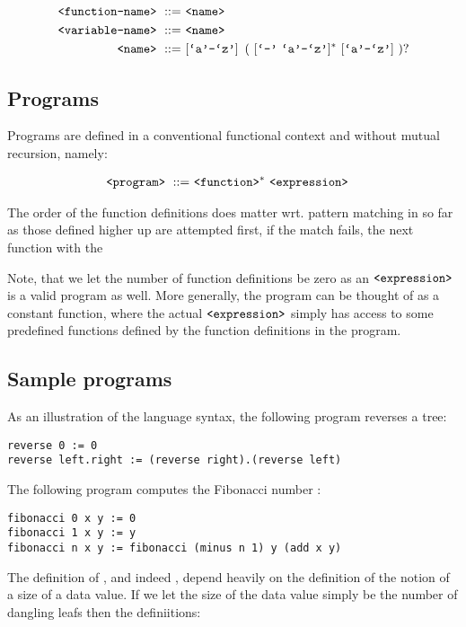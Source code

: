 \begin{align}
\text{{\ttfamily<function-name>}}\ ::=&\ \text{{\ttfamily<name>}}\\
\text{{\ttfamily<variable-name>}}\ ::=&\ \text{{\ttfamily<name>}}\\
\text{{\ttfamily<name>}}\ ::=&\ [\text{{\ttfamily`a'}}\text{{\ttfamily-}}\text{{\ttfamily`z'}}]
\ \left (\ [\text{{\ttfamily`-'}}\ \text{{\ttfamily`a'}}\text{{\ttfamily-}}\text{{\ttfamily`z'}}]^*
\ [\text{{\ttfamily`a'}}\text{{\ttfamily-}}\text{{\ttfamily`z'}}]\ \right )?
\end{align}

\subsection{Programs}

Programs are defined in a conventional functional context and without mutual
recursion, namely:

\begin{align}
\text{{\ttfamily<program>}}\ ::=&\ \text{{\ttfamily<function>}}^*\ \text{{\ttfamily<expression>}}
\end{align}

The order of the function definitions does matter wrt. pattern matching in so far as those defined higher up are attempted first, if the match fails, the next function with the

Note, that we let the number of function definitions be zero as an
$\text{{\ttfamily<expression>}}$ is a valid program as well. More generally, the program
can be thought of as a constant function, where the actual
$\text{{\ttfamily<expression>}}$ simply has access to some predefined functions defined
by the function definitions in the program.

\subsection{Sample programs}

As an illustration of the language syntax, the following program reverses a tree:

\begin{verbatim}
reverse 0 := 0
reverse left.right := (reverse right).(reverse left)
\end{verbatim}

The following program computes the Fibonacci number :

\begin{verbatim}
fibonacci 0 x y := 0
fibonacci 1 x y := y
fibonacci n x y := fibonacci (minus n 1) y (add x y)
\end{verbatim}

The definition of ,  and indeed , depend heavily
on the definition of the notion of a size of a data value. If we let the size
of the data value simply be the number of dangling leafs then the definiitions: 


